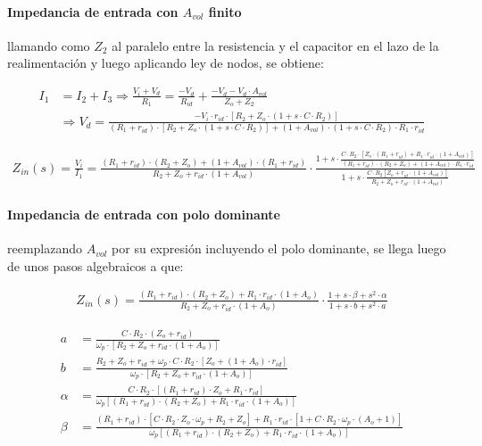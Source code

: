 \paragraph*{Impedancia de entrada con $A_{vol}$ finito} llamando como $Z_2$ al paralelo entre la resistencia y el capacitor en el lazo de la realimentaci\'on y luego aplicando ley de nodos, se obtiene:

\begin{align*}
	I_1 & = I_2 + I_3 \Rightarrow \frac{V_i + V_d}{R_1} = \frac{-V_d}{R_{id}} + \frac{-V_d - V_d \cdot A_{vol}}{Z_o + Z_2}\\
	& \Rightarrow
	V_d = \frac{- V_i \cdot r_{id} \cdot \left[ R_2 + Z_o \cdot (1 + s \cdot C \cdot R_2) \right]}{(R_1 + r_{id}) \cdot \left[R_2 + Z_o \cdot (1 + s \cdot C \cdot R_2) \right] + (1 + A_{vol}) \cdot ( 1 + s \cdot C \cdot R_2) \cdot R_1 \cdot r_{id}}
\end{align*}

\begin{align}
	Z_{in}(s) = \frac{V_i}{I_1} = \frac{(R_1 + r_{id}) \cdot (R_2 + Z_o) + (1 + A_{vol}) \cdot (R_1 + r_{id})}{R_2 + Z_o + r_{id} \cdot(1 + A_{vol})} \cdot \frac{1 + s \cdot \frac{C \cdot R_2 \cdot \left[ Z_o \cdot (R_1 + r_{id}) + R_1 \cdot r_{id} \cdot ( 1 + A_{vol}) \right]}{(R_1 + r_{id}) \cdot (R_2 + Z_o) + (1 + A_{vol}) \cdot R_1 \cdot r_{id}}}{1 + s \cdot \frac{C \cdot R_2 \left[ Z_o + r_{id} \cdot ( 1 + A_{vol}) \right]}{R_2 + Z_o + r_{id} \cdot ( 1 + A_{vol})}}
\end{align}

\paragraph*{Impedancia de entrada con polo dominante} reemplazando $A_{vol}$ por su expresi\'on incluyendo el polo dominante, se llega luego de unos pasos algebraicos a que:

\begin{align}
	Z_{in}(s) = \frac{(R_1+r_{id})\cdot(R_2 + Z_o) + R_1 \cdot r_{id} \cdot(1+A_o)}{R_2 + Z_o + r_{id} \cdot(1 + A_o)} \cdot \frac{1 + s \cdot \beta + s^{2} \cdot \alpha}{1 + s \cdot b + s^{2} \cdot a }
\end{align}

\begin{align*}
	a & = \frac{C \cdot R_2 \cdot (Z_o + r_{id})}{\omega_p \cdot \left[ R_2 + Z_o + r_{id} \cdot(1 + A_o) \right]} \\
	b & = \frac{R_2 + Z_o + r_{id} + \omega_p \cdot C \cdot R_2 \cdot \left[ Z_o + (1 + A_o) \cdot r_{id} \right] }{\omega_p \cdot \left[ R_2 + Z_o + r_{id} \cdot(1 + A_o) \right] } \\
	\alpha & = \frac{C \cdot R_2 \cdot \left[ (R_1 + r_{id}) \cdot Z_o + R_1 \cdot r_{id} \right] }{\omega_p \left[ (R_1 + r_{id}) \cdot (R_2 + Z_o) + R_1 \cdot r_{id} \cdot(1 + A_o) \right]} \\
	\beta & = \frac{(R_1 + r_{id}) \cdot \left[C \cdot R_2 \cdot Z_o \cdot \omega_p + R_2 + Z_o \right] + R_1 \cdot r_{id} \cdot \left[ 1 + C \cdot R_2 \cdot \omega_p \cdot (A_o + 1) \right] }{\omega_p \left[ (R_1 + r_{id}) \cdot (R_2 + Z_o) + R_1 \cdot r_{id} \cdot(1 + A_o) \right] }
\end{align*}

